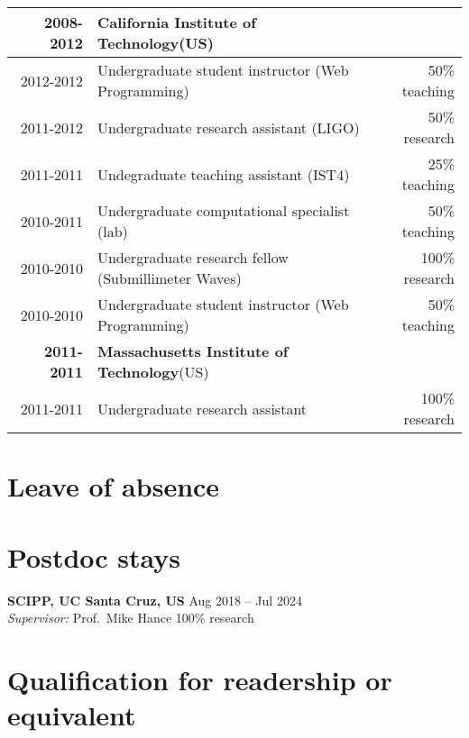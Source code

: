 \begin{table*}[h!]
\begin{tabular}{r|lr}
		\hline\hline
		\normalsize\textbf{2008-2012}    & \textbf{California Institute of Technology}(US)      &                  \\
		\hline
		2012-2012                        & Undergraduate student instructor (Web Programming)   & 50\% teaching    \\
		2011-2012                        & Undergraduate research assistant (LIGO)              & 50\% research    \\
		2011-2011                        & Undegraduate teaching assistant (IST4)               & 25\% teaching    \\
		2010-2011                        & Undergraduate computational specialist (lab)         & 50\% teaching    \\
		2010-2010                        & Undergraduate research fellow (Submillimeter Waves)  & 100\% research   \\
		2010-2010                        & Undergraduate student instructor (Web Programming)   & 50\% teaching    \\
		\hline\hline
		\normalsize\textbf{~2011-2011}   & \textbf{Massachusetts Institute of Technology}(US)   &                  \\
		2011-2011                        & Undergraduate research assistant                     & 100\% research   \\
		\hline
	\end{tabular}
\end{table*}

\vspace{-2.5em}\section{Leave of absence \none}\label{sec:leave-of-absense-none}

\vspace{-0.0em}\section{Postdoc stays}\label{sec:postdoc-stays}
\textbf{SCIPP, UC Santa Cruz, US} \hfill Aug 2018 -- Jul 2024 \\
\textsl{Supervisor:} Prof.~Mike Hance \hfill 100\% research

\vspace{-2.0em}\section{Qualification for readership or equivalent \noneyet}\label{sec:qualification-for-readership-or-equivalent}
\, \\

